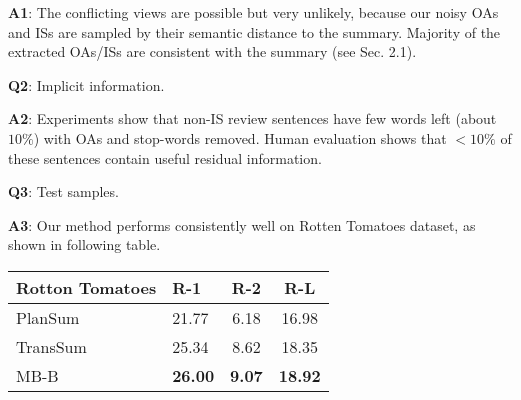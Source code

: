 \documentclass[letterpaper]{article} %
\begin{document}
\noindent 
\textbf{A1}: The conflicting views are possible but very unlikely, because
our noisy OAs and ISs are sampled by their semantic distance to the summary.
Majority of the extracted OAs/ISs are consistent with the summary (see Sec. 2.1).  

\noindent
\textbf{Q2}: Implicit information.

\noindent 
\textbf{A2}: Experiments show that non-IS review sentences have few words left (about $10\%$)
with OAs and stop-words removed. 
Human evaluation shows that $<10\%$ of these
sentences contain useful residual information. 

\noindent
\textbf{Q3}: Test samples.

\noindent 
\textbf{A3}: Our method performs consistently well on Rotten Tomatoes dataset,  
as shown in following table.
\begin{table}[h!]
	\scriptsize
	\centering
	\begin{tabular}{|l|m{0.6cm}<{\centering}|c|c|}
		\hline
	    \bf Rotton Tomatoes&R-1 & R-2 & R-L \\
		\hline
		PlanSum & 21.77 & 6.18  & 16.98 \\
		TransSum &25.34& 8.62& 18.35 \\
		MB-B & \bf 26.00 & \bf 9.07 & \bf 18.92   \\
		\hline
	\end{tabular}
\end{table}

\end{document}
